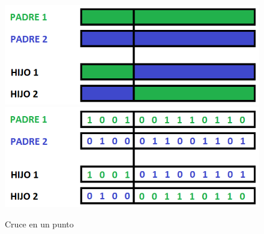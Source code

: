 \begin{itemize}
\begin{figure}[H]
		\centering
		\includegraphics[scale=0.5]{imagenes/Crossover1point.png}
		\includegraphics[scale=0.5]{imagenes/Crossover1pointNumber.png}
        \caption{Cruce en un punto}
        \label{fig:Crossover1}
\end{figure}


\end{itemize}
